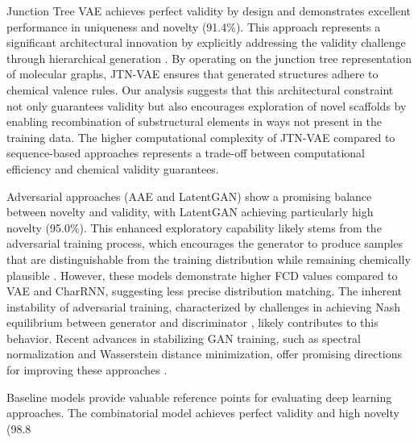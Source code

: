 \documentclass[conference]{IEEEtran}
\begin{document}
Junction Tree VAE achieves perfect validity by design and demonstrates excellent performance in uniqueness and novelty (91.4\%). This approach represents a significant architectural innovation by explicitly addressing the validity challenge through hierarchical generation \cite{Jin2018}. By operating on the junction tree representation of molecular graphs, JTN-VAE ensures that generated structures adhere to chemical valence rules. Our analysis suggests that this architectural constraint not only guarantees validity but also encourages exploration of novel scaffolds by enabling recombination of substructural elements in ways not present in the training data. The higher computational complexity of JTN-VAE compared to sequence-based approaches represents a trade-off between computational efficiency and chemical validity guarantees.

Adversarial approaches (AAE and LatentGAN) show a promising balance between novelty and validity, with LatentGAN achieving particularly high novelty (95.0\%). This enhanced exploratory capability likely stems from the adversarial training process, which encourages the generator to produce samples that are distinguishable from the training distribution while remaining chemically plausible \cite{Prykhodko2019}. However, these models demonstrate higher FCD values compared to VAE and CharRNN, suggesting less precise distribution matching. The inherent instability of adversarial training, characterized by challenges in achieving Nash equilibrium between generator and discriminator \cite{Goodfellow2014}, likely contributes to this behavior. Recent advances in stabilizing GAN training, such as spectral normalization and Wasserstein distance minimization, offer promising directions for improving these approaches \cite{Moret2020}.

Baseline models provide valuable reference points for evaluating deep learning approaches. The combinatorial model achieves perfect validity and high novelty (98.8%
\end{document}
